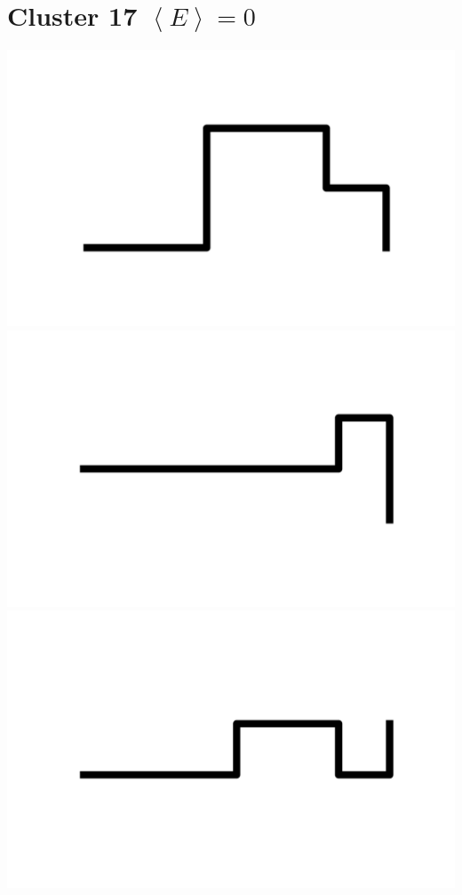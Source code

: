 \documentclass[]{report}
\begin{document}
\section{Cluster 17 $\left < E \right > = 0$} 
\includegraphics[scale=.1]{pictures/17/state_cluster_shapes_0.pdf} 
\includegraphics[scale=.1]{pictures/17/state_cluster_shapes_1.pdf} 
\includegraphics[scale=.1]{pictures/17/state_cluster_shapes_2.pdf} 
\end{document}
